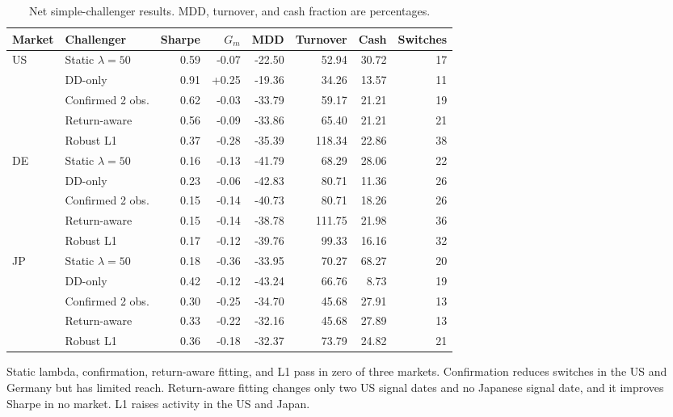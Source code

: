 \documentclass[11pt]{article}
\begin{document}
\begin{table}[H]
\centering
\caption{Net simple-challenger results. MDD, turnover, and cash fraction are
percentages.}
\label{tab:simple}
\scriptsize
\begin{tabular}{llrrrrrr}
\toprule
Market & Challenger & Sharpe & \(G_m\) & MDD & Turnover & Cash & Switches \\
\midrule
US & Static \(\lambda=50\) & 0.59 & -0.07 & -22.50 & 52.94 & 30.72 & 17 \\
   & DD-only               & 0.91 & +0.25 & -19.36 & 34.26 & 13.57 & 11 \\
   & Confirmed 2 obs.      & 0.62 & -0.03 & -33.79 & 59.17 & 21.21 & 19 \\
   & Return-aware          & 0.56 & -0.09 & -33.86 & 65.40 & 21.21 & 21 \\
   & Robust L1             & 0.37 & -0.28 & -35.39 & 118.34 & 22.86 & 38 \\
\addlinespace
DE & Static \(\lambda=50\) & 0.16 & -0.13 & -41.79 & 68.29 & 28.06 & 22 \\
   & DD-only               & 0.23 & -0.06 & -42.83 & 80.71 & 11.36 & 26 \\
   & Confirmed 2 obs.      & 0.15 & -0.14 & -40.73 & 80.71 & 18.26 & 26 \\
   & Return-aware          & 0.15 & -0.14 & -38.78 & 111.75 & 21.98 & 36 \\
   & Robust L1             & 0.17 & -0.12 & -39.76 & 99.33 & 16.16 & 32 \\
\addlinespace
JP & Static \(\lambda=50\) & 0.18 & -0.36 & -33.95 & 70.27 & 68.27 & 20 \\
   & DD-only               & 0.42 & -0.12 & -43.24 & 66.76 & 8.73 & 19 \\
   & Confirmed 2 obs.      & 0.30 & -0.25 & -34.70 & 45.68 & 27.91 & 13 \\
   & Return-aware          & 0.33 & -0.22 & -32.16 & 45.68 & 27.89 & 13 \\
   & Robust L1             & 0.36 & -0.18 & -32.37 & 73.79 & 24.82 & 21 \\
\bottomrule
\end{tabular}
\end{table}

Static lambda, confirmation, return-aware fitting, and L1 pass in zero of three
markets. Confirmation reduces switches in the US and Germany but has limited
reach. Return-aware fitting changes only two US signal dates and no Japanese
signal date, and it improves Sharpe in no market. L1 raises activity in the US
and Japan.
\end{document}
